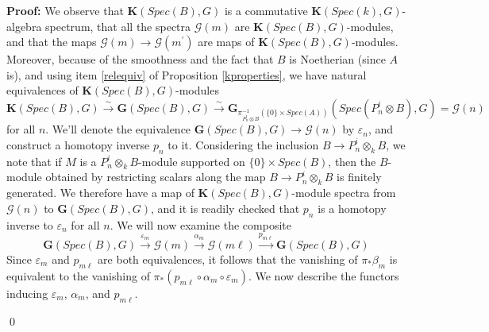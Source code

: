 \documentclass[11pt]{article}
\newcommand\mc{\mathcal}
\def \bK{\mathbf K}
\newcommand\mfk{\mathbf G}
\newenvironment{Proof}{\par\noindent\textbf{Proof:}}
{\qed}
\begin{document}
\begin{Proof}
We observe that $\bK(Spec(B),G)$ is a commutative $\bK(Spec(k),G)$-algebra  spectrum, that all the spectra $\mc{G}(m)$ are $\bK(Spec(B),G)$-modules, and that the maps $\mc{G}(m) \rightarrow \mc{G}(m^{\prime})$ are maps of $\bK(Spec(B),G)$-modules. Moreover, because of the smoothness and the fact that  $B$ is Noetherian  (since $A$ is), and using item \ref{relequiv} of Proposition \ref{kproperties}, we have natural equivalences of $\bK(Spec(B), G)$-modules 
$$ \bK(Spec(B),G) \xrightarrow{\sim}\mfk(Spec(B),G) \xrightarrow{\sim}  \mfk _{\pi ^{-1}_{P^i_n \otimes B}(\{ 0 \} \times Spec(A) )}(Spec(P^i_n \otimes B),G)= \mc{G}(n)
$$
for all $n$.  
We'll denote the equivalence $\mfk(Spec(B),G) \rightarrow \mc{G}(n) $ by $\varepsilon_n$, and  construct a homotopy inverse $p_n$ to it.  Considering the inclusion $B \rightarrow P^i_n \otimes _k B $, we note that if $M$ is a $P^i_n \otimes _k B$-module supported on $\{ 0 \} \times Spec(B)$, then the $B$-module obtained by restricting scalars along the map $B \rightarrow P^i_n \otimes _k B$ is finitely generated.  We therefore have  a map of $\bK(Spec(B),G)$-module spectra from $ \mc{G}(n) $ to $ \mfk (Spec(B),G) $, and it is readily checked that $p_n$ is a homotopy inverse to $\varepsilon_n$ for all $n$.  We will now examine the composite 
$$ \mfk(Spec(B) ,G) \xrightarrow{ \varepsilon _m} \mc{G}(m) \xrightarrow{\alpha _m} \mc{G}(m \ell)  \xrightarrow{p_{m \ell} } \mfk(Spec(B),G)
$$
Since $\varepsilon_m $ and $p_{m \ell}$ are both equivalences, it follows that the vanishing of $\pi _*\beta _m$ is equivalent to the vanishing of $\pi _* (p_{m \ell }\circ\alpha _m \circ \varepsilon_m ) $. We now describe the functors inducing $\varepsilon_m$, $\alpha _m$, and $p_{m \ell}$.  


\end{Proof}
\end{document}
